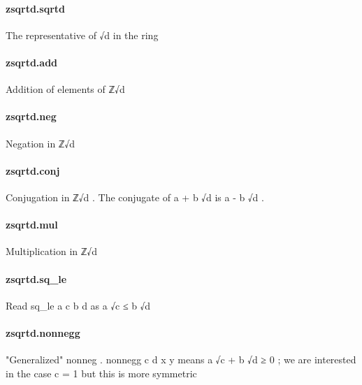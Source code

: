 \documentclass{article}
\begin{document}
\paragraph{zsqrtd.sqrtd}
\par
The representative of 
\colorbox[RGB]{253,246,227}{{{{\color[RGB]{101, 123, 131} √d }}}} in the ring
\paragraph{zsqrtd.add}
\par
Addition of elements of 
\colorbox[RGB]{253,246,227}{{{{\color[RGB]{101, 123, 131} ℤ√d }}}}\paragraph{zsqrtd.neg}
\par
Negation in 
\colorbox[RGB]{253,246,227}{{{{\color[RGB]{101, 123, 131} ℤ√d }}}}\paragraph{zsqrtd.conj}
\par
Conjugation in 
\colorbox[RGB]{253,246,227}{{{{\color[RGB]{101, 123, 131} ℤ√d }}}}. The conjugate of 
\colorbox[RGB]{253,246,227}{{{{\color[RGB]{101, 123, 131} a  }}}{{{\color[RGB]{181, 137, 0} + }}}{{{\color[RGB]{101, 123, 131}  b √d }}}} is 
\colorbox[RGB]{253,246,227}{{{{\color[RGB]{101, 123, 131} a  }}}{{{\color[RGB]{181, 137, 0} - }}}{{{\color[RGB]{101, 123, 131}  b √d }}}}.
\paragraph{zsqrtd.mul}
\par
Multiplication in 
\colorbox[RGB]{253,246,227}{{{{\color[RGB]{101, 123, 131} ℤ√d }}}}\paragraph{zsqrtd.sq\_le}
\par
Read 
\colorbox[RGB]{253,246,227}{{{{\color[RGB]{101, 123, 131} sq\_le a c b d }}}} as 
\colorbox[RGB]{253,246,227}{{{{\color[RGB]{101, 123, 131} a √c  }}}{{{\color[RGB]{181, 137, 0} ≤ }}}{{{\color[RGB]{101, 123, 131}  b √d }}}}\paragraph{zsqrtd.nonnegg}
\par
"Generalized" 
\colorbox[RGB]{253,246,227}{{{{\color[RGB]{101, 123, 131} nonneg }}}}. 
\colorbox[RGB]{253,246,227}{{{{\color[RGB]{101, 123, 131} nonnegg c d x y }}}} means 
\colorbox[RGB]{253,246,227}{{{{\color[RGB]{101, 123, 131} a √c  }}}{{{\color[RGB]{181, 137, 0} + }}}{{{\color[RGB]{101, 123, 131}  b √d  }}}{{{\color[RGB]{181, 137, 0} ≥ }}}{{{\color[RGB]{101, 123, 131}   }}}{{{\color[RGB]{108, 113, 196} 0 }}}};
we are interested in the case 
\colorbox[RGB]{253,246,227}{{{{\color[RGB]{101, 123, 131} c  }}}{{{\color[RGB]{181, 137, 0} = }}}{{{\color[RGB]{101, 123, 131}   }}}{{{\color[RGB]{108, 113, 196} 1 }}}} but this is more symmetric
\end{document}
